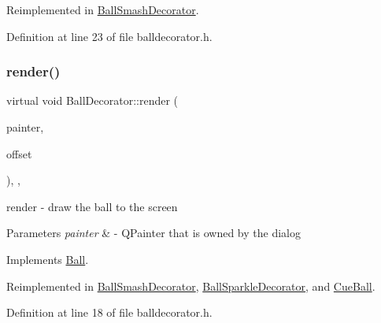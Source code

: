 Reimplemented in \mbox{\hyperlink{class_ball_smash_decorator_a017998926f2b3ebdfcf49e074ea86aae}{Ball\+Smash\+Decorator}}.



Definition at line 23 of file balldecorator.\+h.

\mbox{\label{class_ball_decorator_af8205f8033b2490ecd3365c24ff5cdeb}} 
\subsubsection{\texorpdfstring{render()}{render()}}
{\footnotesize\ttfamily virtual void Ball\+Decorator\+::render (\begin{DoxyParamCaption}\item[{Q\+Painter \&}]{painter,  }\item[{const Q\+Vector2D \&}]{offset }\end{DoxyParamCaption})\hspace{0.3cm}{\ttfamily [inline]}, {\ttfamily [override]}, {\ttfamily [virtual]}}



render -\/ draw the ball to the screen 


\begin{DoxyParams}{Parameters}
{\em painter} & -\/ Q\+Painter that is owned by the dialog \\
\hline
\end{DoxyParams}


Implements \mbox{\hyperlink{class_ball_a307773aaa59aee90cef8767b0c22deca}{Ball}}.



Reimplemented in \mbox{\hyperlink{class_ball_smash_decorator_a8cbf47d481100f16f2376670fee9fdcc}{Ball\+Smash\+Decorator}}, \mbox{\hyperlink{class_ball_sparkle_decorator_a3f292b99228264bee08c672184ab6ad5}{Ball\+Sparkle\+Decorator}}, and \mbox{\hyperlink{class_cue_ball_a915a83205e4cfc720fbd884b045e2f81}{Cue\+Ball}}.



Definition at line 18 of file balldecorator.\+h.

\mbox{\label{class_ball_decorator_aad7c3ecc4449881048f8610ecc73ec31}} 
